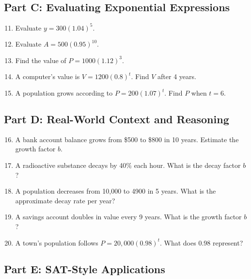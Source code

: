 \documentclass[14pt]{extarticle}
\begin{document}
\subsection*{Part C: Evaluating Exponential Expressions}
\begin{enumerate}
  \setcounter{enumi}{10}
  \item Evaluate \(y = 300(1.04)^5.\)
  \item Evaluate \(A = 500(0.95)^{10}.\)
  \item Find the value of \(P = 1000(1.12)^3.\)
  \item A computer’s value is \(V = 1200(0.8)^t.\) Find \(V\) after 4 years.
  \item A population grows according to \(P = 200(1.07)^t.\) Find \(P\) when \(t = 6.\)
\end{enumerate}

\subsection*{Part D: Real-World Context and Reasoning}
\begin{enumerate}
  \setcounter{enumi}{15}
  \item A bank account balance grows from \$500 to \$800 in 10 years. Estimate the growth factor \(b.\)
  \item A radioactive substance decays by 40\% each hour. What is the decay factor \(b\)?
  \item A population decreases from 10,000 to 4900 in 5 years. What is the approximate decay rate per year?
  \item A savings account doubles in value every 9 years. What is the growth factor \(b\)?
  \item A town’s population follows \(P = 20{,}000(0.98)^t.\) What does 0.98 represent?
\end{enumerate}

\subsection*{Part E: SAT-Style Applications}
\end{document}
